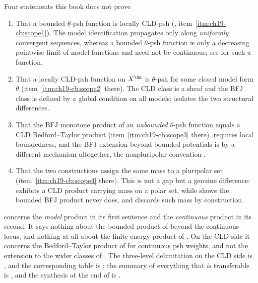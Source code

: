 \begin{warning}{Four statements this book does not prove}
\begin{enumerate}
\item\label{itm:ch24-notproved:psh}
 That a bounded \(\theta\)-psh function is locally CLD-psh
 (, item~\cref{itm:ch19-cb:scope1}).  The
 model identification propagates only along \emph{uniformly} convergent
 sequences, whereas a bounded \(\theta\)-psh function is only a decreasing
 pointwise limit of model functions and need not be continuous; see
  for such a function.
\item\label{itm:ch24-notproved:converse}
 That a locally CLD-psh function on \(X^{\An}\) is \(\theta\)-psh for some
 closed model form \(\theta\) (item~\cref{itm:ch19-cb:scope2} there).  The
 CLD class is a sheaf and the BFJ class is defined by a global condition on
 all models;  isolates the two structural
 differences.
\item\label{itm:ch24-notproved:unbounded}
 That the BFJ monotone product of an \emph{unbounded} \(\theta\)-psh
 function equals a CLD Bedford--Taylor product
 (item~\cref{itm:ch19-cb:scope3} there).  
 requires local boundedness, and the BFJ extension beyond bounded
 potentials is by a different mechanism altogether, the nonpluripolar
 convention .
\item\label{itm:ch24-notproved:polar}
 That the two constructions assign the same mass to a pluripolar set
 (item~\cref{itm:ch19-cb:scope4} there).  This is not a gap but a genuine
 difference:  exhibits a CLD product carrying
 mass on a polar set, while  shows the
 bounded BFJ product never does, and
  discards such mass by construction.
\end{enumerate}
\end{warning}

\begin{remark}
\label{rem:ch24-which-product}
 concerns the \emph{model} product in its
first sentence and the \emph{continuous} product in its second.  It says
nothing about the bounded product of  beyond
the continuous locus, and nothing at all about the finite-energy product of
.  On the CLD side it concerns the Bedford--Taylor
product of  for continuous psh weights, and not the
extension to the wider classes of .  The
three-level delimitation on the CLD side is
, and the corresponding table is
; the summary of everything that
\emph{is} transferable is , and the synthesis at the
end of  is
.
\end{remark}


